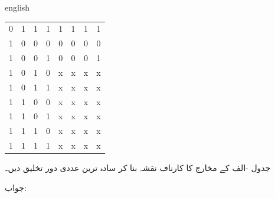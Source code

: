 \begin{table}
\begin{subtable}{0.45\textwidth}
\begin{otherlanguage*}{english}
\begin{LTR}
\begin{tabular}{CCCC|CCCC}
0&1&1&1&1&1&1&1\\
1&0&0&0&0&0&0&0\\
1&0&0&1&0&0&0&1\\
1&0&1&0&x&x&x&x\\
1&0&1&1&x&x&x&x\\
1&1&0&0&x&x&x&x\\
1&1&0&1&x&x&x&x\\
1&1&1&0&x&x&x&x\\
1&1&1&1&x&x&x&x\\
\bottomrule
\end{tabular}
\end{LTR}
 \end{otherlanguage*}
\end{subtable}
\end{table}
جدول -الف  کے     مخارج کا کارناف نقشہ  بنا کر  سادہ ترین عددی دور تخلیق دیں۔


جواب:\quad


